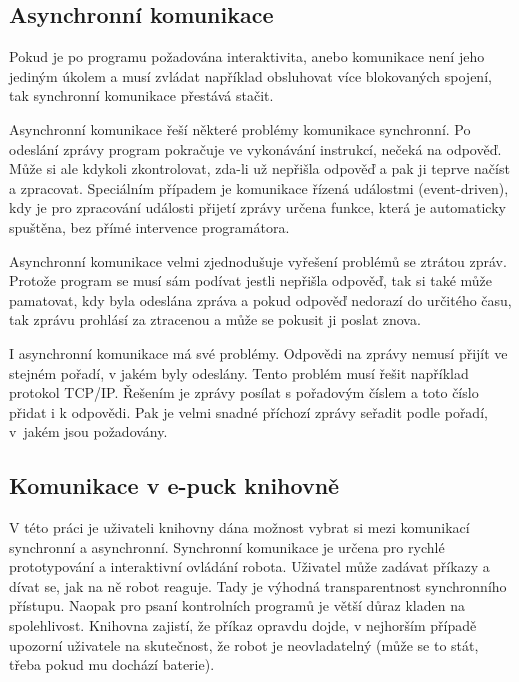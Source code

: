     \subsection{Asynchronní komunikace}
    \label{async}

    Pokud je po programu požadována interaktivita, anebo komunikace není jeho
    jediným úkolem a musí zvládat například obsluhovat více blokovaných
    spojení, tak synchronní komunikace přestává stačit.

    Asynchronní komunikace řeší některé problémy komunikace synchronní. Po
    odeslání zprávy program pokračuje ve vykonávání instrukcí, nečeká na
    odpověď. Může si ale kdykoli zkontrolovat, zda-li už nepřišla odpověď a pak
    ji teprve načíst a zpracovat. Speciálním případem je komunikace řízená
    událostmi (event-driven), kdy je pro zpracování události přijetí zprávy
    určena funkce, která je automaticky spuštěna, bez přímé intervence
    programátora.

    Asynchronní komunikace velmi zjednodušuje vyřešení problémů se ztrátou
    zpráv. Protože program se musí sám podívat jestli nepřišla odpověď, tak si
    také může pamatovat, kdy byla odeslána zpráva a pokud odpověď nedorazí do
    určitého času, tak zprávu prohlásí za ztracenou a může se pokusit ji poslat
    znova.

    I asynchronní komunikace má své problémy. Odpovědi na zprávy nemusí přijít
    ve stejném pořadí, v jakém byly odeslány. Tento problém musí řešit
    například protokol TCP/IP. Řešením je zprávy posílat s pořadovým číslem a
    toto číslo přidat i k odpovědi. Pak je velmi snadné příchozí zprávy seřadit
    podle pořadí, v~jakém jsou požadovány.

    \subsection{Komunikace v e-puck knihovně}
    \label{comm-epuck}

    V této práci je uživateli knihovny dána možnost vybrat si mezi komunikací
    synchronní a asynchronní. Synchronní komunikace je určena pro rychlé
    prototypování a interaktivní ovládání robota. Uživatel může zadávat příkazy
    a dívat se, jak na ně robot reaguje. Tady je výhodná transparentnost
    synchronního přístupu. Naopak pro psaní kontrolních programů je větší důraz
    kladen na spolehlivost. Knihovna zajistí, že příkaz opravdu dojde, v
    nejhorším případě upozorní uživatele na skutečnost, že robot je
    neovladatelný (může se to stát, třeba pokud mu dochází baterie).

